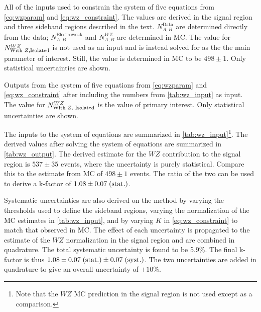 \begin{table}
\centering

\caption{All of the inputs used to constrain the system of five equations
from \eqn\eqref{eq:wzparam} and \eqn\eqref{eq:wz_constraint}.
The values are derived in the signal region and three sideband regions
described in the text. $N^{\textrm{Data}}_{A,B}$ are determined directly
from the data; $N^{\textrm{Electroweak}}_{A,B}$ and $N^{WZ}_{A,B}$ are 
determined in MC. The value for $N^{WZ}_{\textrm{With \z,Isolated}}$ is
not used as an input and is instead solved for as the the main
parameter of interest. Still, the value is determined in MC to be
$498 \pm 1$.  Only statistical uncertainties are shown.}
\label{tab:wz_input}
\end{table}

\begin{table}
\centering

\caption{Outputs from the system of five equations
from \eqn\eqref{eq:wzparam} and \eqn\eqref{eq:wz_constraint}
after including the numbers from \tab\ref{tab:wz_input} as input.
The value for $N^{WZ}_{\textrm{With \z, Isolated}}$ is 
the value of primary interest.  Only statistical uncertainties are shown.}
\label{tab:wz_output}
\end{table}


The inputs to the system of equations are summarized in 
\tab\ref{tab:wz_input}\footnote{Note that the $WZ$ MC prediction in 
the signal region is not used except as a comparison.}.
The derived values after solving the system of equations are
summarized in \tab\ref{tab:wz_output}. 
The derived estimate for the $WZ$ contribution to 
the signal region is 
$537 \pm 35$
events, where the uncertainty is purely statistical. 
Compare this to the estimate from MC of 
$498 \pm 1$ events.
The ratio of the two can be used to derive a k-factor of
$1.08\pm0.07\mbox{$\;$(stat.)}$. 


Systematic uncertainties are also derived on the method
by varying the 
thresholds used to define the sideband regions, varying the normalization
of the MC estimates in \tab\ref{tab:wz_input}, and by varying $K$ 
in \eqn\eqref{eq:wz_constraint} to match that observed in MC. The effect of each
uncertainty is propagated to the estimate of the $WZ$ normalization in
the signal region and are combined in quadrature. The total systematic
uncertainty is found to be 5.9\%. 
The final k-factor is thus $1.08 \pm0.07\mbox{$\;$(stat.)}\pm0.07\mbox{$\;$(syst.)}$.
The two uncertainties are added in quadrature to give an overall uncertainty
of $\pm 10\%$.

